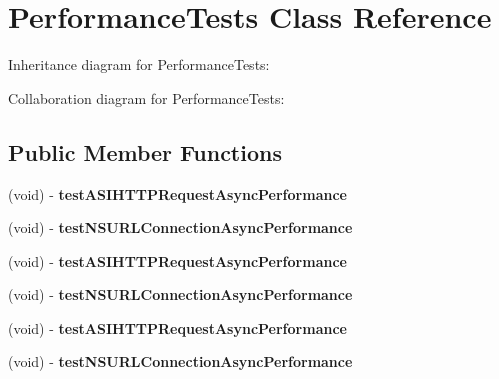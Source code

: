 \hypertarget{interface_performance_tests}{
\section{\-Performance\-Tests \-Class \-Reference}
\label{interface_performance_tests}
}


\-Inheritance diagram for \-Performance\-Tests\-:


\-Collaboration diagram for \-Performance\-Tests\-:
\subsection*{\-Public \-Member \-Functions}
\begin{DoxyCompactItemize}
\item 
\hypertarget{interface_performance_tests_a8422f6bc3942bd60f902ac02874861d5}{
(void) -\/ {\bfseries test\-A\-S\-I\-H\-T\-T\-P\-Request\-Async\-Performance}}
\label{interface_performance_tests_a8422f6bc3942bd60f902ac02874861d5}

\item 
\hypertarget{interface_performance_tests_a233daefbd81744cc7a02c605dbb7a614}{
(void) -\/ {\bfseries test\-N\-S\-U\-R\-L\-Connection\-Async\-Performance}}
\label{interface_performance_tests_a233daefbd81744cc7a02c605dbb7a614}

\item 
\hypertarget{interface_performance_tests_a8422f6bc3942bd60f902ac02874861d5}{
(void) -\/ {\bfseries test\-A\-S\-I\-H\-T\-T\-P\-Request\-Async\-Performance}}
\label{interface_performance_tests_a8422f6bc3942bd60f902ac02874861d5}

\item 
\hypertarget{interface_performance_tests_a233daefbd81744cc7a02c605dbb7a614}{
(void) -\/ {\bfseries test\-N\-S\-U\-R\-L\-Connection\-Async\-Performance}}
\label{interface_performance_tests_a233daefbd81744cc7a02c605dbb7a614}

\item 
\hypertarget{interface_performance_tests_a8422f6bc3942bd60f902ac02874861d5}{
(void) -\/ {\bfseries test\-A\-S\-I\-H\-T\-T\-P\-Request\-Async\-Performance}}
\label{interface_performance_tests_a8422f6bc3942bd60f902ac02874861d5}

\item 
\hypertarget{interface_performance_tests_a233daefbd81744cc7a02c605dbb7a614}{
(void) -\/ {\bfseries test\-N\-S\-U\-R\-L\-Connection\-Async\-Performance}}
\label{interface_performance_tests_a233daefbd81744cc7a02c605dbb7a614}


\end{DoxyCompactItemize}

